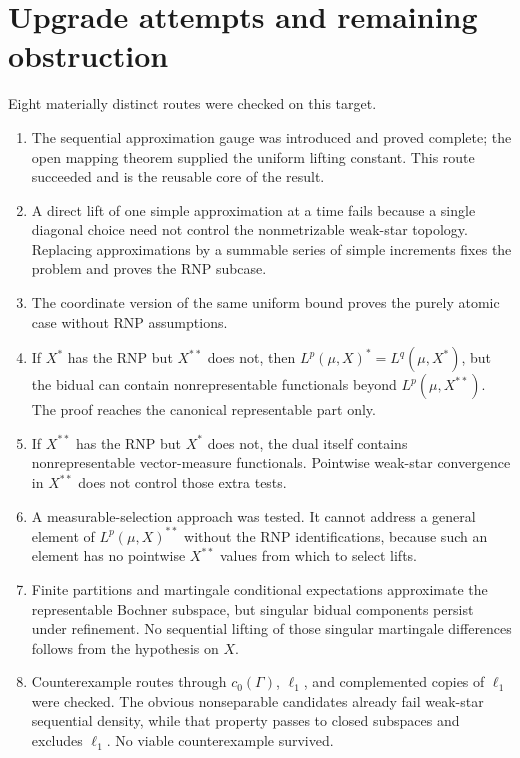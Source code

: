\documentclass[11pt]{article}
\begin{document}
\section{Upgrade attempts and remaining obstruction}

Eight materially distinct routes were checked on this target.

\begin{enumerate}[leftmargin=*,label=\textbf{Route \arabic*.}]
\item The sequential approximation gauge was introduced and proved complete;
the open mapping theorem supplied the uniform lifting constant.  This route
succeeded and is the reusable core of the result.

\item A direct lift of one simple approximation at a time fails because a
single diagonal choice need not control the nonmetrizable weak-star topology.
Replacing approximations by a summable series of simple increments fixes the
problem and proves the RNP subcase.

\item The coordinate version of the same uniform bound proves the purely
atomic case without RNP assumptions.

\item If $X^*$ has the RNP but $X^{**}$ does not, then
$L^p(\mu,X)^*=L^q(\mu,X^*)$, but the bidual can contain nonrepresentable
functionals beyond $L^p(\mu,X^{**})$.  The proof reaches the canonical
representable part only.

\item If $X^{**}$ has the RNP but $X^*$ does not, the dual itself contains
nonrepresentable vector-measure functionals.  Pointwise weak-star convergence
in $X^{**}$ does not control those extra tests.

\item A measurable-selection approach was tested.  It cannot address a
general element of $L^p(\mu,X)^{**}$ without the RNP identifications, because
such an element has no pointwise $X^{**}$ values from which to select lifts.

\item Finite partitions and martingale conditional expectations approximate
the representable Bochner subspace, but singular bidual components persist
under refinement.  No sequential lifting of those singular martingale
differences follows from the hypothesis on $X$.

\item Counterexample routes through $c_0(\Gamma)$, $\ell_1$, and complemented
copies of $\ell_1$ were checked.  The obvious nonseparable candidates already
fail weak-star sequential density, while that property passes to closed
subspaces and excludes $\ell_1$.  No viable counterexample survived.
\end{enumerate}
\end{document}
